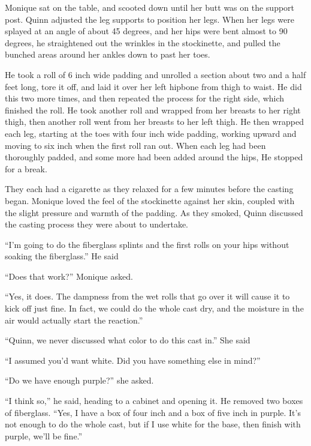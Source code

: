 \begin{thought}
Monique sat on the table, and scooted down until her butt was on the support post. Quinn
adjusted the leg supports to position her legs. When her legs were splayed at an angle of about
45 degrees, and her hips were bent almost to 90 degrees, he straightened out the wrinkles in the
stockinette, and pulled the bunched areas around her ankles down to past her toes.

He took a roll of 6 inch wide padding and unrolled a section about two and a half feet
long, tore it off, and laid it over her left hipbone from thigh to waist. He did this two more
times, and then repeated the process for the right side, which finished the roll. He took
another roll and wrapped from her breasts to her right thigh, then another roll went from her
breasts to her left thigh. He then wrapped each leg, starting at the toes with four inch wide
padding, working upward and moving to six inch when the first roll ran out. When each leg had
been thoroughly padded, and some more had been added around the hips, He stopped for a break.

They each had a cigarette as they relaxed for a few minutes before the casting began.
Monique loved the feel of the stockinette against her skin, coupled with the slight pressure and
warmth of the padding. As they smoked, Quinn discussed the casting process they were about to
undertake.
\end{thought}

``I'm going to do the fiberglass splints and the first rolls on your hips without soaking
the fiberglass.'' He said

``Does that work?'' Monique asked.

``Yes, it does. The dampness from the wet rolls that go over it will cause it to kick off
just fine. In fact, we could do the whole cast dry, and the moisture in the air would actually
start the reaction.''

``Quinn, we never discussed what color to do this cast in.'' She said

``I assumed you'd want white. Did you have something else in mind?''

``Do we have enough purple?'' she asked.

``I think so,'' he said, heading to a cabinet and opening it. He removed two boxes of
fiberglass. ``Yes, I have a box of four inch and a box of five inch in purple. It's not enough
to
do the whole cast, but if I use white for the base, then finish with purple, we'll be fine.''

